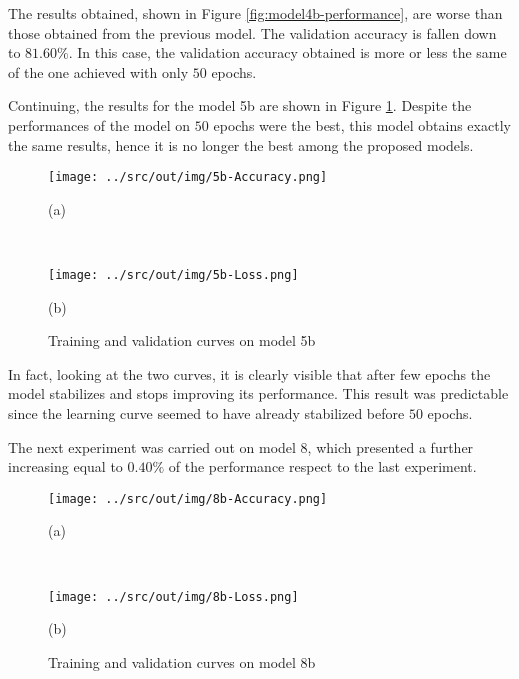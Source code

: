 \documentclass[a4paper,12pt]{article} %
\begin{document}
	The results obtained, shown in Figure \ref{fig:model4b-performance}, are 
	worse than those obtained from the previous model. The validation accuracy 
	is fallen down to $81.60\%$. In this case, the validation accuracy obtained 
	is more or less the same of the one achieved with only $50$ epochs.
	\newline
	
	Continuing, the results for the model 5b are shown in Figure 
	\ref{fig:model5b-performance}. Despite the performances of the model on 
	$50$ epochs were the best, this model obtains exactly the same results, 
	hence it is no longer the best among the proposed models. 
	
	\begin{figure}[htb]
		\begin{minipage}[c]{.49\textwidth}
			\centering
			\texttt{[image: ../src/out/img/5b-Accuracy.png]}
			\caption*{(a)}
		\end{minipage}
		~
		\begin{minipage}[c]{.49\textwidth}
			\centering
			\texttt{[image: ../src/out/img/5b-Loss.png]}
			\caption*{(b)}
		\end{minipage}
		\caption{Training and validation curves on model 5b}
		\label{fig:model5b-performance}
	\end{figure}

	In fact, looking at the two curves, it is clearly visible that after few 
	epochs the model stabilizes and stops improving its performance.
	This result was predictable since the learning curve seemed to have already 
	stabilized before $50$ epochs.
	\newline

	The next experiment was carried out on model 8, which presented a further 
	increasing equal to $0.40\%$ of the performance respect to the last 
	experiment.
	
	\begin{figure}[htb]
		\begin{minipage}[c]{.49\textwidth}
			\centering
			\texttt{[image: ../src/out/img/8b-Accuracy.png]}
			\caption*{(a)}
		\end{minipage}
		~
		\begin{minipage}[c]{.49\textwidth}
			\centering
			\texttt{[image: ../src/out/img/8b-Loss.png]}
			\caption*{(b)}
		\end{minipage}
		\caption{Training and validation curves on model 8b}
		\label{fig:model8b-performance}
	\end{figure}
\end{document}
